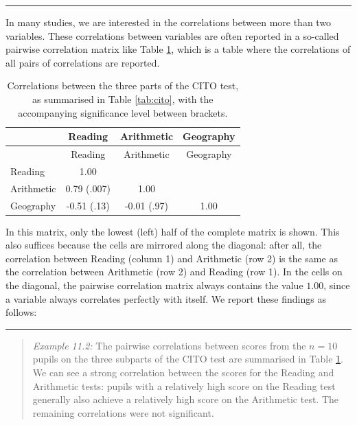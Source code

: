 \documentclass[
]{book}
\begin{document}
\begin{center}\rule{0.5\linewidth}{0.5pt}\end{center}

In many studies, we are interested in the correlations between more
than two variables. These correlations between variables are often
reported in a so-called pairwise
correlation matrix like
Table \ref{tab:cito-correlations}, which is a table where the correlations
of all pairs of correlations are reported.

\begin{longtable}[]{@{}lccc@{}}
\caption{\label{tab:cito-correlations} Correlations between the three parts of the CITO
test, as summarised in Table \ref{tab:cito}, with the accompanying significance level between brackets.}\tabularnewline
\toprule
& Reading & Arithmetic & Geography \\
\midrule
\endfirsthead
\toprule
& Reading & Arithmetic & Geography \\
\midrule
\endhead
Reading & 1.00 & & \\
Arithmetic & 0.79 (.007) & 1.00 & \\
Geography & -0.51 (.13) & -0.01 (.97) & 1.00 \\
\bottomrule
\end{longtable}

In this matrix, only the lowest (left) half of the complete
matrix is shown. This also suffices because the cells are mirrored
along the diagonal: after all, the correlation between Reading (column 1) and Arithmetic
(row 2) is the same as the correlation between Arithmetic (row 2) and
Reading (row 1). In the cells on the diagonal, the pairwise correlation matrix
always contains the value \(1.00\), since a variable always correlates perfectly with
itself.
We report these findings as follows:

\begin{center}\rule{0.5\linewidth}{0.5pt}\end{center}

\begin{quote}
\emph{Example 11.2:} The
pairwise correlations between scores from the \(n=10\) pupils on the
three subparts of the CITO test are summarised in
Table \ref{tab:cito-correlations}. We can see a strong correlation between
the scores for the Reading and Arithmetic tests: pupils with a relatively
high score on the Reading test generally also achieve a relatively high
score on the Arithmetic test. The remaining correlations were
not significant.
\end{quote}
\end{document}

